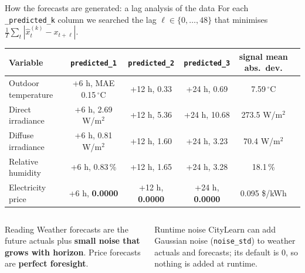 \documentclass[aspectratio=169,10pt]{beamer}
\begin{document}
\begin{frame}{How the forecasts are generated: a lag analysis of the data}
\small
For each \texttt{\_predicted\_k} column we searched the lag $\ell \in \{0,\dots,48\}$ that minimises $\frac{1}{T}\sum_t |\hat x^{(k)}_t - x_{t+\ell}|$.
\vspace{0.3em}
\centering
\begin{tabular}{@{}lccccc@{}}
\toprule
Variable & \texttt{predicted\_1} & \texttt{predicted\_2} & \texttt{predicted\_3} & signal mean abs.\ dev. \\
\midrule
Outdoor temperature & +6 h, MAE 0.15\,$^\circ$C & +12 h, 0.33 & +24 h, 0.69 & 7.59\,$^\circ$C \\
Direct irradiance & +6 h, 2.69 W/m$^2$ & +12 h, 5.36 & +24 h, 10.68 & 273.5 W/m$^2$ \\
Diffuse irradiance & +6 h, 0.81 W/m$^2$ & +12 h, 1.60 & +24 h, 3.23 & 70.4 W/m$^2$ \\
Relative humidity & +6 h, 0.83\,\% & +12 h, 1.65 & +24 h, 3.28 & 18.1\,\% \\
Electricity price & +6 h, \textbf{0.0000} & +12 h, \textbf{0.0000} & +24 h, \textbf{0.0000} & 0.095 \$/kWh \\
\bottomrule
\end{tabular}
\vspace{0.5em}
\begin{columns}[T]
\begin{block}{Reading}
Weather forecasts are the future actuals plus \textbf{small noise that grows with horizon}. Price forecasts are \textbf{perfect foresight}.
\end{block}
\begin{block}{Runtime noise}
CityLearn can add Gaussian noise (\texttt{noise\_std}) to weather actuals and forecasts; its default is 0, so nothing is added at runtime.
\end{block}
\end{columns}
\end{frame}
\end{document}
